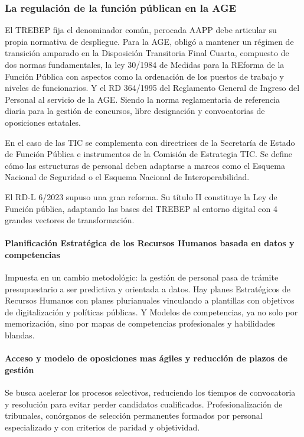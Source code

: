     \subsubsection{La regulación de la función públican en la AGE} %
        El TREBEP fija el denominador común, perocada AAPP debe articular su propia normativa de despliegue. Para la AGE, obligó a mantener un régimen de transición amparado en la Disposición Transitoria Final Cuarta, compuesto de dos normas fundamentales, la ley 30/1984 de Medidas para la REforma de la Función Pública con aspectos como la ordenación de los puestos de trabajo y niveles de funcionarios. Y el RD 364/1995 del Reglamento General de Ingreso del Personal al servicio de la AGE. Siendo la norma reglamentaria de referencia diaria para la gestión de concursos, libre designación y convocatorias de oposiciones estatales.

        En el caso de las TIC se complementa con directrices de la Secretaría de Estado de Función Pública e instrumentos de la Comisión de Estrategia TIC. Se define cómo las estructuras de personal deben adaptarse a marcos como el Esquema Nacional de Seguridad o el Esquema Nacional de Interoperabilidad.

        El RD-L 6/2023 supuso una gran reforma. Su título II constituye la Ley de Función pública, adaptando las bases del TREBEP al entorno digital con 4 grandes vectores de transformación.

        \paragraph{Planificación Estratégica de los Recursos Humanos basada en datos y competencias}
            Impuesta en un cambio metodológic: la gestión de personal pasa de trámite presupuestario a ser predictiva y orientada a datos. Hay planes Estratégicos de Recursos Humanos con planes plurianuales vinculando a plantillas con objetivos de digitalización y políticas públicas. Y Modelos de competencias, ya no solo por memorización, sino por mapas de competencias profesionales y habilidades blandas.

        \paragraph{Acceso y modelo de oposiciones mas ágiles y reducción de plazos de gestión}
            Se busca acelerar los procesos selectivos, reduciendo los tiempos de convocatoria y resolución para evitar perder candidatos cualificados. Profesionalización de tribunales, conórganos de selección permanentes formados por personal especializado y con criterios de paridad y objetividad.

